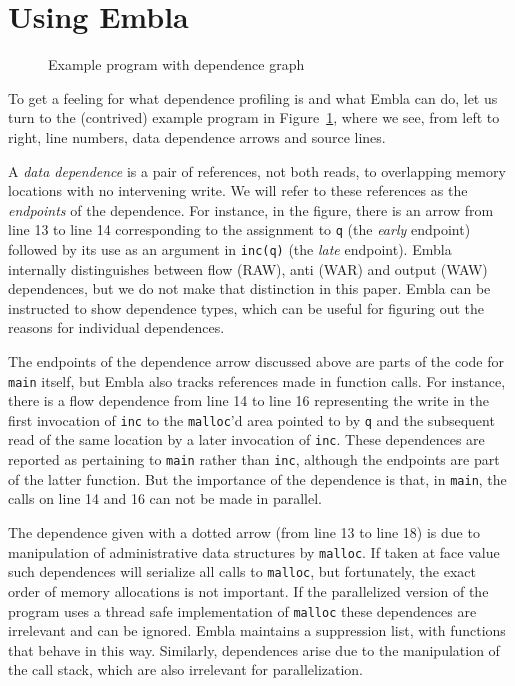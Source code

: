 \documentclass[times, 10pt,twocolumn]{article}
\begin{document}


\section{Using Embla}

\begin{figure} 
\small

\caption{Example program with dependence graph} \label{ffirstex}
\end{figure}

To get a feeling for what dependence profiling is and what Embla can do, 
let us turn to the (contrived) example program in Figure~\ref{ffirstex},
where we see, from left to right, line numbers, data dependence 
arrows and source lines. 

A {\em data dependence} is a pair
of references, not both reads, to overlapping memory
locations with no intervening write. We will refer to these
references as the {\em endpoints} of the dependence.
For instance, in the figure, 
there is an arrow from line 13 to line 14 corresponding to
the assignment to {\tt q} (the {\em early} endpoint) followed by its use 
as an argument in {\tt inc(q)} (the {\em late} endpoint). Embla
internally distinguishes between flow (RAW), anti (WAR) and output (WAW) 
dependences, but we do not make that distinction in this paper. Embla 
can be instructed to show dependence types, which can be
useful for figuring out the reasons for individual dependences.

The endpoints of the dependence arrow discussed above are parts of
the code for {\tt main} itself, but Embla also tracks references made 
in function calls. For
instance, there is a flow dependence from line 14 to line 16
representing the write in the first invocation of {\tt inc} to the 
{\tt malloc}'d area pointed to by {\tt q} and the subsequent read 
of the same location by a later invocation of {\tt inc}. 
These dependences 
are reported as pertaining to {\tt main} rather than {\tt inc},
although the endpoints are part of the latter function. 
But the importance of the dependence is that, in {\tt main}, the calls
on line 14 and 16 can not be made in parallel.

The dependence given with a dotted arrow 
(from line 13 to line 18) is due to manipulation of administrative 
data structures by {\tt malloc}. If taken at face value such dependences will
serialize all calls to {\tt malloc}, but fortunately, the exact order
of memory allocations is not important. If the 
parallelized version of the program uses a thread safe 
implementation of {\tt malloc} these dependences are irrelevant and
can be ignored. Embla maintains a suppression list, with functions that behave 
in this way.  Similarly, dependences arise due to the
manipulation of the call stack, which are also irrelevant for parallelization.
\end{document}
